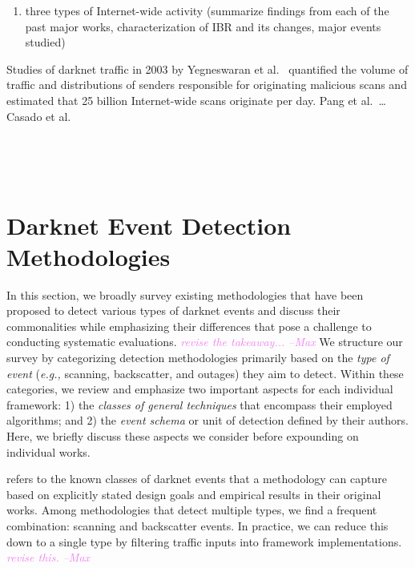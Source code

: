 \documentclass[manuscript,nonacm]{acmart}
\newcommand{\maxnote}[1]{\textit{\textcolor{violet}{#1 --Max}}}
\begin{document}
\begin{enumerate}
    \item three types of Internet-wide activity (summarize findings from each of the past major works, characterization of IBR and its changes, major events studied)
\end{enumerate}

Studies of darknet traffic in 2003 by Yegneswaran et al.~\cite{2004yegneswaran} quantified the volume of traffic and distributions of senders responsible for originating malicious scans 
and estimated that 25 billion Internet-wide scans originate per day.
Pang et al.~\cite{2004pang}\dots
Casado et al.~\cite{2005casado}

~\cite{2004yegneswaran,2004pang}

~\cite{2011dainotti,2013benson,2015benson,2012dainotti}~\cite{2021padmanabhan}


\label{sec:frameworks}
\section{Darknet Event Detection Methodologies}

In this section, we broadly survey existing methodologies that have been proposed to detect various types of darknet events and discuss their commonalities 
while emphasizing their differences that pose a challenge to conducting systematic evaluations. \maxnote{revise the takeaway...}
We structure our survey by categorizing detection methodologies primarily based on the \textit{type of event} (\textit{e.g.,} scanning, backscatter, and outages) 
they aim to detect. Within these categories, we review and emphasize two important aspects for each individual framework: 1) the \textit{classes of general techniques} that encompass their employed algorithms; 
and 2) the \textit{event schema} or unit of detection defined by their authors. 
Here, we briefly discuss these aspects we consider before expounding on individual works.

\vspace{0.25em}
 refers to the known classes of darknet events that a methodology can capture based on explicitly stated design goals and empirical results in their original works.
Among methodologies that detect multiple types, we find a frequent combination: scanning and backscatter events.
In practice, we can reduce this down to a single type by filtering traffic inputs into framework implementations.
\maxnote{revise this.}
\end{document}
